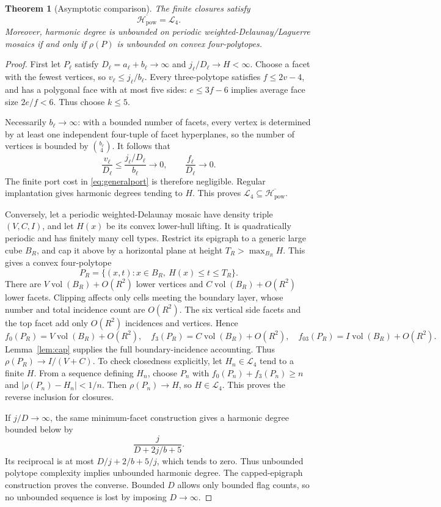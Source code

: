 \documentclass[11pt,a4paper]{article}
\newtheorem{theorem}{Theorem}[section]
\theoremstyle{definition}\newtheorem{definition}[theorem]{Definition}
\theoremstyle{remark}\newtheorem{remark}[theorem]{Remark}
\begin{document}
\begin{theorem}[Asymptotic comparison]\label{thm:equivalence}
The finite closures satisfy
\[
 \overline{\mathcal H_{\mathrm{pow}}}=\mathcal L_4.
\]
Moreover, harmonic degree is unbounded on periodic weighted-Delaunay/Laguerre mosaics if and only if \(\rho(P)\) is unbounded on convex four-polytopes.
\end{theorem}
\begin{proof}
First let \(P_\ell\) satisfy \(D_\ell=a_\ell+b_\ell\to\infty\) and \(j_\ell/D_\ell\to H<\infty\). Choose a facet with the fewest vertices, so \(v_\ell\le j_\ell/b_\ell\). Every three-polytope satisfies \(f\le2v-4\), and has a polygonal face with at most five sides: \(e\le3f-6\) implies average face size \(2e/f<6\). Thus choose \(k\le5\).

Necessarily \(b_\ell\to\infty\): with a bounded number of facets, every vertex is determined by at least one independent four-tuple of facet hyperplanes, so the number of vertices is bounded by \(\binom{b_\ell}{4}\). It follows that
\[
 \frac{v_\ell}{D_\ell}\le\frac{j_\ell/D_\ell}{b_\ell}\longrightarrow0,
 \qquad \frac{f_\ell}{D_\ell}\longrightarrow0.
\]
The finite port cost in \eqref{eq:generalport} is therefore negligible. Regular implantation gives harmonic degrees tending to \(H\). This proves \(\mathcal L_4\subseteq\overline{\mathcal H_{\mathrm{pow}}}\).

Conversely, let a periodic weighted-Delaunay mosaic have density triple \((V,C,I)\), and let \(H(x)\) be its convex lower-hull lifting. It is quadratically periodic and has finitely many cell types. Restrict its epigraph to a generic large cube \(B_R\), and cap it above by a horizontal plane at height \(T_R>\max_{B_R}H\). This gives a convex four-polytope
\[
 P_R=\{(x,t):x\in B_R,\ H(x)\le t\le T_R\}.
\]
There are \(V\operatorname{vol}(B_R)+O(R^2)\) lower vertices and \(C\operatorname{vol}(B_R)+O(R^2)\) lower facets. Clipping affects only cells meeting the boundary layer, whose number and total incidence count are \(O(R^2)\). The six vertical side facets and the top facet add only \(O(R^2)\) incidences and vertices. Hence
\[
 f_0(P_R)=V\operatorname{vol}(B_R)+O(R^2),\quad
 f_3(P_R)=C\operatorname{vol}(B_R)+O(R^2),\quad
 f_{03}(P_R)=I\operatorname{vol}(B_R)+O(R^2).
\]
Lemma~\ref{lem:cap} supplies the full boundary-incidence accounting. Thus \(\rho(P_R)\to I/(V+C)\). To check closedness explicitly, let $H_n\in\mathcal L_4$ tend to a finite $H$. From a sequence defining $H_n$, choose $P_n$ with $f_0(P_n)+f_3(P_n)\ge n$ and $|\rho(P_n)-H_n|<1/n$. Then $\rho(P_n)\to H$, so $H\in\mathcal L_4$. This proves the reverse inclusion for closures.

If \(j/D\to\infty\), the same minimum-facet construction gives a harmonic degree bounded below by
\[
 \frac{j}{D+2j/b+5}.
\]
Its reciprocal is at most \(D/j+2/b+5/j\), which tends to zero. Thus unbounded polytope complexity implies unbounded harmonic degree. The capped-epigraph construction proves the converse. Bounded \(D\) allows only bounded flag counts, so no unbounded sequence is lost by imposing \(D\to\infty\).
\end{proof}
\end{document}
